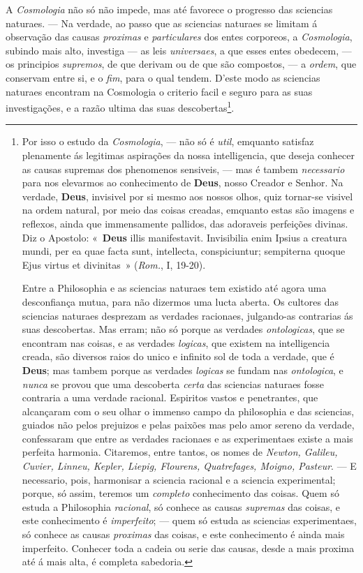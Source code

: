  A \emph{Cosmologia} não só não impede,
mas até favorece o progresso das sciencias naturaes. --- Na verdade, ao passo que as
sciencias naturaes se limitam á observação das causas \emph{proximas} e
\emph{particulares} dos entes corporeos, a \emph{Cosmologia}, subindo mais alto,
investiga --- as leis \emph{universaes}, a que esses entes obedecem, --- os principios
\emph{supremos}, de que derivam ou de que são compostos, --- a \emph{ordem}, que
conservam entre si, e o \emph{fim}, para o qual tendem. D'este modo as sciencias
naturaes encontram na Cosmologia o criterio facil e seguro para as suas investigações, e
a razão ultima das suas descobertas\footnote{Por isso o estudo da \emph{Cosmologia}, ---
não só é \emph{util}, emquanto satisfaz plenamente ás legitimas aspirações da nossa
intelligencia, que deseja conhecer as causas supremas dos phenomenos sensiveis, --- mas é
tambem \emph{necessario} para nos elevarmos ao conhecimento de \textbf{Deus}, nosso
Creador e Senhor. Na verdade, \textbf{Deus}, invisivel por si mesmo aos nossos olhos,
quiz tornar-se visivel na ordem natural, por meio das coisas creadas, emquanto estas são
imagens e reflexos, ainda que immensamente pallidos, das adoraveis perfeições divinas.
Diz o Apostolo: «~\textbf{Deus} illis manifestavit. Invisibilia enim Ipsius a creatura
mundi, per ea quae facta sunt, intellecta, conspiciuntur; sempiterna quoque Ejus virtus et
divinitas~» (\emph{Rom.}, I, 19-20).

Entre a Philosophia e as sciencias naturaes tem existido até agora uma desconfiança
mutua, para não dizermos uma lucta aberta. Os cultores das sciencias naturaes desprezam
as verdades racionaes, julgando-as contrarias ás suas descobertas. Mas erram; não só
porque as verdades \emph{ontologicas}, que se encontram nas coisas, e as verdades
\emph{logicas}, que existem na intelligencia creada, são diversos raios do unico e
infinito sol de toda a verdade, que é \textbf{Deus}; mas tambem porque as verdades
\emph{logicas} se fundam nas \emph{ontologica}, e \emph{nunca} se provou que uma
descoberta \emph{certa} das sciencias naturaes fosse contraria a uma verdade racional.
Espiritos vastos e penetrantes, que alcançaram com o seu olhar o immenso campo da
philosophia e das sciencias, guiados não pelos prejuizos e pelas paixões mas pelo amor
sereno da verdade, confessaram que entre as verdades racionaes e as experimentaes existe
a mais perfeita harmonia. Citaremos, entre tantos, os nomes de \emph{Newton, Galileu,
Cuvier, Linneu, Kepler, Liepig, Flourens, Quatrefages, Moigno, Pasteur}. --- E
necessario, pois, harmonisar a sciencia racional e a sciencia experimental; porque, só
assim, teremos um \emph{completo} conhecimento das coisas. Quem só estuda a Philosophia
\emph{racional}, só conhece as causas \emph{supremas} das coisas, e este conhecimento é
\emph{imperfeito}; --- quem só estuda as sciencias experimentaes, só conhece as causas
\emph{proximas} das coisas, e este conhecimento é ainda mais imperfeito. Conhecer toda a
cadeia ou serie das causas, desde a mais proxima até á mais alta, é completa
sabedoria.}.

